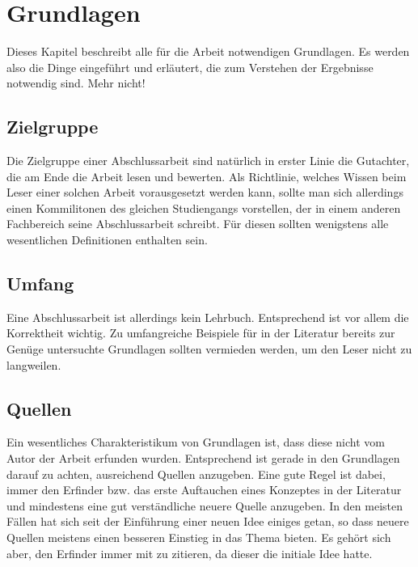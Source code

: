 
\chapter{Grundlagen}
\label{chapter:grundlagen}

Dieses Kapitel beschreibt alle für die Arbeit notwendigen Grundlagen. Es werden also die Dinge eingeführt und erläutert, die zum Verstehen der Ergebnisse notwendig sind. Mehr nicht!

\section{Zielgruppe}

Die Zielgruppe einer Abschlussarbeit sind natürlich in erster Linie die Gutachter, die am Ende die Arbeit lesen und bewerten. Als Richtlinie, welches Wissen beim Leser einer solchen Arbeit vorausgesetzt werden kann, sollte man sich allerdings einen Kommilitonen des gleichen Studiengangs vorstellen, der in einem anderen Fachbereich seine Abschlussarbeit schreibt. Für diesen sollten wenigstens alle wesentlichen Definitionen enthalten sein.

\section{Umfang}

Eine Abschlussarbeit ist allerdings kein Lehrbuch. Entsprechend ist vor allem die Korrektheit wichtig. Zu umfangreiche Beispiele für in der Literatur bereits zur Genüge untersuchte Grundlagen sollten vermieden werden, um den Leser nicht zu langweilen.

\section{Quellen}

Ein wesentliches Charakteristikum von Grundlagen ist, dass diese nicht vom Autor der Arbeit erfunden wurden. Entsprechend ist gerade in den Grundlagen darauf zu achten, ausreichend Quellen anzugeben. Eine gute Regel ist dabei, immer den Erfinder bzw. das erste Auftauchen eines Konzeptes in der Literatur und mindestens eine gut verständliche neuere Quelle anzugeben. In den meisten Fällen hat sich seit der Einführung einer neuen Idee einiges getan, so dass neuere Quellen meistens einen besseren Einstieg in das Thema bieten. Es gehört sich aber, den Erfinder immer mit zu zitieren, da dieser die initiale Idee hatte.
